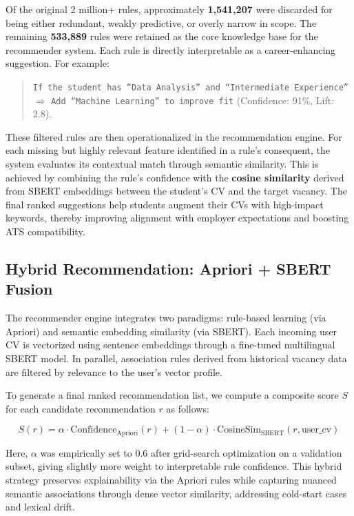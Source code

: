 \documentclass[runningheads]{llncs}
\begin{document}
	Of the original 2 million+ rules, approximately \textbf{1,541,207} were discarded for being either redundant, weakly predictive, or overly narrow in scope. The remaining \textbf{533,889} rules were retained as the core knowledge base for the recommender system. Each rule is directly interpretable as a career-enhancing suggestion. For example:
	
	\begin{quote}
		\small
		\texttt{If the student has “Data Analysis” and “Intermediate Experience”} $\Rightarrow$ \texttt{Add “Machine Learning” to improve fit} (Confidence: 91\%, Lift: 2.8).
	\end{quote}
	
	These filtered rules are then operationalized in the recommendation engine. For each missing but highly relevant feature identified in a rule’s consequent, the system evaluates its contextual match through semantic similarity. This is achieved by combining the rule’s confidence with the \textbf{cosine similarity} derived from SBERT embeddings between the student’s CV and the target vacancy. The final ranked suggestions help students augment their CVs with high-impact keywords, thereby improving alignment with employer expectations and boosting ATS compatibility.
	
	
	\subsection{Hybrid Recommendation: Apriori + SBERT Fusion}
	
	The recommender engine integrates two paradigms: rule-based learning (via Apriori) and semantic embedding similarity (via SBERT). Each incoming user CV is vectorized using sentence embeddings through a fine-tuned multilingual SBERT model. In parallel, association rules derived from historical vacancy data are filtered by relevance to the user’s vector profile.
	
	To generate a final ranked recommendation list, we compute a composite score $S$ for each candidate recommendation $r$ as follows:
	
	\[
	S(r) = \alpha \cdot \text{Confidence}_{\text{Apriori}}(r) + (1 - \alpha) \cdot \text{CosineSim}_{\text{SBERT}}(r, \text{user\_cv})
	\]
	
	Here, $\alpha$ was empirically set to 0.6 after grid-search optimization on a validation subset, giving slightly more weight to interpretable rule confidence. This hybrid strategy preserves explainability via the Apriori rules while capturing nuanced semantic associations through dense vector similarity, addressing cold-start cases and lexical drift.
	
\end{document}
